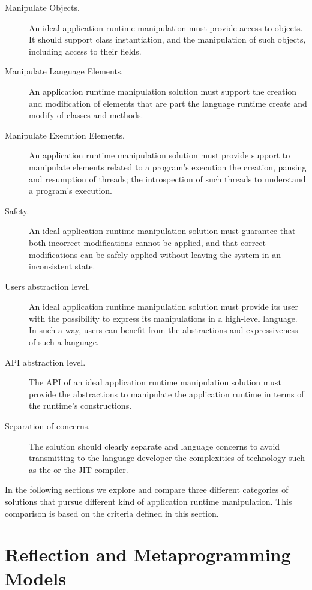 \begin{description}

\item[Manipulate Objects.] An ideal application runtime manipulation must provide access to objects. It should support class instantiation, and the manipulation of such objects, including access to their fields.
\item[Manipulate Language Elements.] An application runtime manipulation solution must support the creation and modification of elements that are part the language runtime \eg create and modify of classes and methods.
\item[Manipulate Execution Elements.] An application runtime manipulation solution must provide support to manipulate elements related to a program's execution \eg the creation, pausing and resumption of threads; the introspection of such threads to understand a program's execution.

\item[Safety.] An ideal application runtime manipulation solution must guarantee that both incorrect modifications cannot be applied, and that correct modifications can be safely applied without leaving the system in an inconsistent state.

\item[Users abstraction level.] An ideal application runtime manipulation solution must provide its user with the possibility to express its manipulations in a high-level language. In such a way, users can benefit from the abstractions and expressiveness of such a language.

\item[API abstraction level.] The API of an ideal application runtime manipulation solution must provide the abstractions to manipulate the application runtime in terms of the runtime's constructions.

\item[Separation of concerns.] The solution should clearly separate \VM and language concerns to avoid transmitting to the language developer the complexities of \VM technology such as the \GC or the JIT compiler.

\end{description}

In the following sections we explore and compare three different categories of solutions that pursue different kind of application runtime manipulation. This comparison is based on the criteria defined in this section.

\section{Reflection and Metaprogramming Models}\label{sec:related_work_changing}

